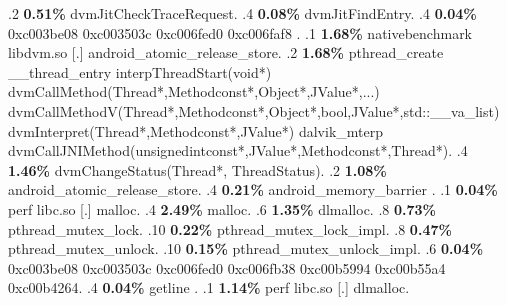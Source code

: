 \begin{profile}
{.2 \textbf{0.51\%} dvmJitCheckTraceRequest. 
.4 \textbf{0.08\%} dvmJitFindEntry. 
.4 \textbf{0.04\%} 0xc003be08\newline {} 0xc003503c\newline {} 0xc006fed0\newline {} 0xc006faf8\newline {} . 
.1 \textbf{ 1.68\%} nativebenchmark  libdvm.so              [.] android\_atomic\_release\_store. 
.2 \textbf{1.68\%} pthread\_create\newline {} \_\_thread\_entry\newline {} interpThreadStart(void*)\newline {} dvmCallMethod(Thread*,Methodconst*,Object*,JValue*,...)\newline {} dvmCallMethodV(Thread*,Methodconst*,Object*,bool,JValue*,std::\_\_va\_list)\newline {} dvmInterpret(Thread*,Methodconst*,JValue*)\newline {} dalvik\_mterp\newline {} dvmCallJNIMethod(unsignedintconst*,JValue*,Methodconst*,Thread*). 
.4 \textbf{1.46\%} dvmChangeStatus(Thread*, ThreadStatus). 
.2 \textbf{1.08\%} android\_atomic\_release\_store. 
.4 \textbf{0.21\%} android\_memory\_barrier\newline {} . 
.1 \textbf{ 0.04\%} perf             libc.so                [.] malloc. 
.4 \textbf{2.49\%} malloc. 
.6 \textbf{1.35\%} dlmalloc. 
.8 \textbf{0.73\%} pthread\_mutex\_lock. 
.10 \textbf{0.22\%} pthread\_mutex\_lock\_impl. 
.8 \textbf{0.47\%} pthread\_mutex\_unlock. 
.10 \textbf{0.15\%} pthread\_mutex\_unlock\_impl. 
.6 \textbf{0.04\%} 0xc003be08\newline {} 0xc003503c\newline {} 0xc006fed0\newline {} 0xc006fb38\newline {} 0xc00b5994\newline {} 0xc00b55a4\newline {} 0xc00b4264. 
.4 \textbf{0.04\%} getline\newline {} . 
.1 \textbf{ 1.14\%} perf             libc.so                [.] dlmalloc. 
}
\end{profile}
